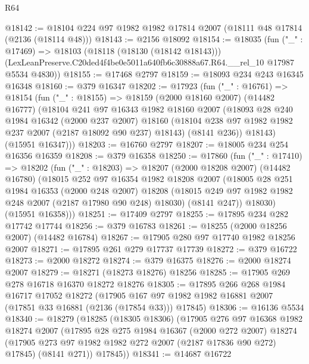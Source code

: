 \begin{lexlean}{R64}
\begin{coremodule}
@18142 := @18104 @224 @97 @1982 @1982 @17814 @2007 (@18111 @48 @17814 (@2136 (@18114 @48)))
@18143 := @2156 @18092
@18154 := @18035
    (fun ("_" : @17469) =>
    @18103
      (@18118 (@18130 (@18142 @18143)))
      (LexLeanPreserve.C20ded4f4be0e5011a640fb6c30888a67.R64.__rel_10 @17987 @5534 @4830))
@18155 := @17468 @2797
@18159 := @18093 @234 @243 @16345 @16348
@18160 := @379 @16347
@18202 := @17923
    (fun ("_" : @16761) =>
    @18154
      (fun ("_" : @18155) =>
      @18159
        (@2000 @18160 @2007)
        (@14482 @16777)
        (@18104
          @241
          @97
          @16343
          @1982
          @18160
          @2007
          (@18093
            @28
            @240
            @1984
            @16342
            (@2000 @237 @2007)
            @18160
            (@18104 @238 @97 @1982 @1982 @237 @2007 (@2187 @18092 @90 @237) @18143)
            (@8141 @236))
          @18143)
        (@15951 @16347)))
@18203 := @16760 @2797
@18207 := @18005 @234 @254 @16356 @16359
@18208 := @379 @16358
@18250 := @17860
    (fun ("_" : @17410) =>
    @18202
      (fun ("_" : @18203) =>
      @18207
        (@2000 @18208 @2007)
        (@14482 @16780)
        (@18015
          @252
          @97
          @16354
          @1982
          @18208
          @2007
          (@18005
            @28
            @251
            @1984
            @16353
            (@2000 @248 @2007)
            @18208
            (@18015 @249 @97 @1982 @1982 @248 @2007 (@2187 @17980 @90 @248) @18030)
            (@8141 @247))
          @18030)
        (@15951 @16358)))
@18251 := @17409 @2797
@18255 := @17895 @234 @282 @17742 @17744
@18256 := @379 @16783
@18261 := @18255 (@2000 @18256 @2007) (@14482 @16784)
@18267 := @17905 @280 @97 @17740 @1982 @18256 @2007
@18271 := @17895 @261 @279 @17737 @17739
@18272 := @379 @16722
@18273 := @2000 @18272
@18274 := @379 @16375
@18276 := @2000 @18274 @2007
@18279 := @18271 (@18273 @18276) @18256
@18285 := @17905 @269 @278 @16718 @16370 @18272 @18276
@18305 := @17895
    @266
    @268
    @1984
    @16717
    @17052
    @18272
    (@17905 @167 @97 @1982 @1982 @16881 @2007 (@17851 @33 @16881 (@2136 (@17854 @33))) @17845)
@18306 := @16136 @5534
@18340 := @18279
    (@18285
      (@18305 @18306)
      (@17905
        @276
        @97
        @16368
        @1982
        @18274
        @2007
        (@17895
          @28
          @275
          @1984
          @16367
          (@2000 @272 @2007)
          @18274
          (@17905 @273 @97 @1982 @1982 @272 @2007 (@2187 @17836 @90 @272) @17845)
          (@8141 @271))
        @17845))
@18341 := @14687 @16722

\end{coremodule}
\end{lexlean}
